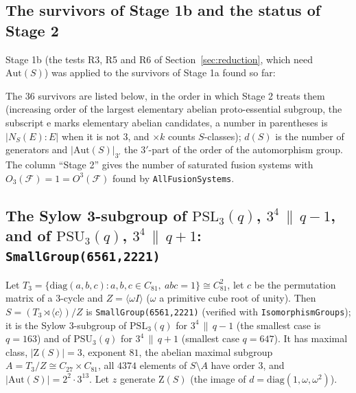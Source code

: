 \documentclass[11pt]{article}
\theoremstyle{definition}
\theoremstyle{remark}
\newcommand{\F}{\mathcal{F}}
\newcommand{\Aut}{\mathrm{Aut}}
\newcommand{\PSL}{\mathrm{PSL}}
\newcommand{\PSU}{\mathrm{PSU}}
\newcommand{\Z}{\mathrm{Z}}
\begin{document}
\subsection{The survivors of Stage 1b and the status of Stage 2}
\label{sec:survivors}

Stage 1b (the tests R3, R5 and R6 of Section~\ref{sec:reduction}, which
need $\Aut(S)$) was applied to the survivors of Stage 1a found so far:
\begin{center}

\end{center}
The $36$ survivors are listed below, in the order in which Stage 2 treats
them (increasing order of the largest elementary abelian proto-essential
subgroup, the subscript $\mathrm e$ marks elementary abelian candidates, a
number in parentheses is $|N_S(E):E|$ when it is not $3$, and $\times k$
counts $S$-classes); $d(S)$ is the number of generators and
$|\Aut(S)|_{3'}$ the $3'$-part of the order of the automorphism group.  The
column ``Stage 2'' gives the number of saturated fusion systems with
$O_3(\F)=1=O^3(\F)$ found by \texttt{AllFusionSystems}.
\begin{center}

\end{center}

\subsection{The Sylow 3-subgroup of $\PSL_3(q)$, $3^4\,\|\,q-1$, and of $\PSU_3(q)$, $3^4\,\|\,q+1$: \texttt{SmallGroup(6561,2221)}}
\label{sec:psl3}

Let $T_3=\{\mathrm{diag}(a,b,c): a,b,c\in C_{81},\ abc=1\}\cong C_{81}^2$, let
$c$ be the permutation matrix of a $3$-cycle and $Z=\langle\omega I\rangle$
($\omega$ a primitive cube root of unity).  Then
$S=(T_3\rtimes\langle c\rangle)/Z$ is \texttt{SmallGroup(6561,2221)}
(verified with \texttt{IsomorphismGroups}); it is the Sylow $3$-subgroup of
$\PSL_3(q)$ for $3^4\,\|\,q-1$ (the smallest case is $q=163$) and of
$\PSU_3(q)$ for $3^4\,\|\,q+1$ (smallest case $q=647$).  It has maximal
class, $|\Z(S)|=3$, exponent $81$, the abelian maximal subgroup
$A=T_3/Z\cong C_{27}\times C_{81}$, all $4374$ elements of $S\setminus A$
have order $3$, and $|\Aut(S)|=2^2\cdot3^{13}$.  Let $z$ generate $\Z(S)$
(the image of $d=\mathrm{diag}(1,\omega,\omega^2)$).
\end{document}
